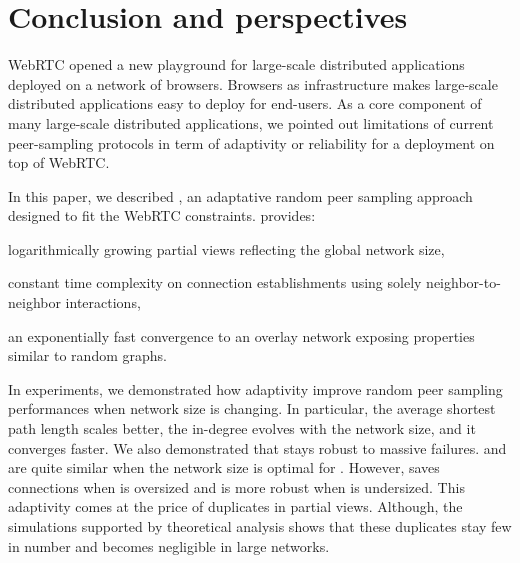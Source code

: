 
\section{Conclusion and perspectives}
\label{sec:conclusion}

WebRTC opened a new playground for large-scale distributed
applications deployed on a network of browsers. Browsers as
infrastructure makes large-scale distributed applications easy to
deploy for end-users. As a core component of many large-scale
distributed applications, we pointed out limitations of current
peer-sampling protocols in term of adaptivity or reliability for a
deployment on top of WebRTC. 

In this paper, we described \SPRAY, an adaptative random peer sampling
approach designed to fit the WebRTC constraints.  \SPRAY provides:
\begin{inparaenum}[(i)]
\item logarithmically growing partial views reflecting the global network size,
\item constant time complexity on connection establishments using solely
  neighbor-to-neighbor interactions,
\item an exponentially fast convergence to an overlay network exposing
  properties similar to random graphs.
\end{inparaenum}

In experiments, we demonstrated how \SPRAY adaptivity improve random
peer sampling performances when network size is changing. In
particular, the average shortest path length scales better, the
in-degree evolves with the network size, and it converges faster.  We
also demonstrated that \SPRAY stays robust to massive failures. \SPRAY
and \CYCLON are quite similar when the network size is optimal for
\CYCLON. However, \SPRAY saves connections when \CYCLON is oversized
and is more robust when \CYCLON is undersized. This adaptivity comes
at the price of duplicates in partial views. Although, the simulations
supported by theoretical analysis shows that these duplicates stay few
in number and becomes negligible in large networks.




